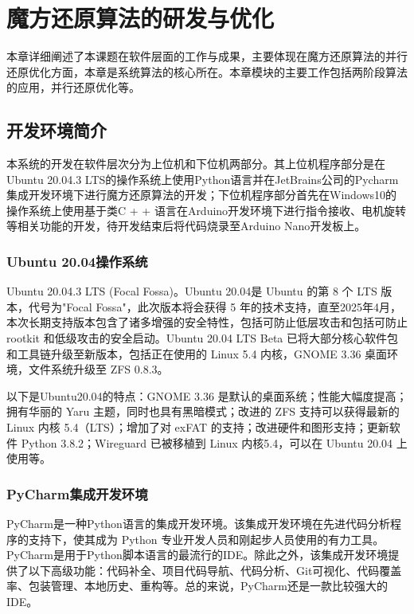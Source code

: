 
\chapter{魔方还原算法的研发与优化}

本章详细阐述了本课题在软件层面的工作与成果，主要体现在魔方还原算法的并行还原优化方面，本章是系统算法的核心所在。本章模块的主要工作包括两阶段算法的应用，并行还原优化等。

\section{开发环境简介}

本系统的开发在软件层次分为上位机和下位机两部分。其上位机程序部分是在Ubuntu 20.04.3 LTS的操作系统上使用Python语言并在JetBrains公司的Pycharm集成开发环境下进行魔方还原算法的开发；下位机程序部分首先在Windows10的操作系统上使用基于类C + + 语言在Arduino开发环境下进行指令接收、电机旋转等相关功能的开发，待开发结束后将代码烧录至Arduino Nano开发板上。

\subsection{Ubuntu 20.04操作系统}

Ubuntu 20.04.3 LTS (Focal Fossa)。Ubuntu 20.04是 Ubuntu 的第 8 个 LTS 版本，代号为"Focal Fossa"，此次版本将会获得 5 年的技术支持，直至2025年4月，本次长期支持版本包含了诸多增强的安全特性，包括可防止低层攻击和包括可防止 rootkit 和低级攻击的安全启动。Ubuntu 20.04 LTS Beta 已将大部分核心软件包和工具链升级至新版本，包括正在使用的 Linux 5.4 内核，GNOME 3.36 桌面环境，文件系统升级至 ZFS 0.8.3。

以下是Ubuntu20.04的特点：GNOME 3.36 是默认的桌面系统；性能大幅度提高；拥有华丽的 Yaru 主题，同时也具有黑暗模式；改进的 ZFS 支持可以获得最新的 Linux 内核 5.4（LTS）；增加了对 exFAT 的支持；改进硬件和图形支持；更新软件 Python 3.8.2；Wireguard 已被移植到 Linux 内核5.4，可以在 Ubuntu 20.04 上使用等。

\subsection{PyCharm集成开发环境}

PyCharm是一种Python语言的集成开发环境。该集成开发环境在先进代码分析程序的支持下，使其成为 Python 专业开发人员和刚起步人员使用的有力工具。PyCharm是用于Python脚本语言的最流行的IDE。除此之外，该集成开发环境提供了以下高级功能：代码补全、项目代码导航、代码分析、Git可视化、代码覆盖率、包装管理、本地历史、重构等。总的来说，PyCharm还是一款比较强大的IDE。

